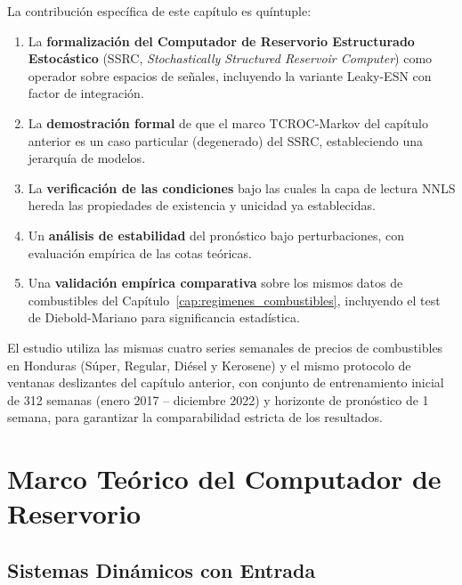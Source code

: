 La contribución específica de este capítulo es quíntuple:
\begin{enumerate}
    \item La \textbf{formalización del Computador de Reservorio
    Estructurado Estocástico} (SSRC, \textit{Stochastically
    Structured Reservoir Computer}) \cite{banegas2025} como operador
    sobre espacios de señales, incluyendo la variante Leaky-ESN con
    factor de integración.
    \item La \textbf{demostración formal} de que el marco
    TCROC-Markov del capítulo anterior es un caso particular
    (degenerado) del SSRC, estableciendo una jerarquía de modelos.
    \item La \textbf{verificación de las condiciones} bajo las cuales
    la capa de lectura NNLS hereda las propiedades de existencia y
    unicidad ya establecidas.
    \item Un \textbf{análisis de estabilidad} del pronóstico bajo
    perturbaciones, con evaluación empírica de las cotas teóricas.
    \item Una \textbf{validación empírica comparativa} sobre los
    mismos datos de combustibles del
    Capítulo~\ref{cap:regimenes_combustibles}, incluyendo el
    test de Diebold-Mariano para significancia estadística.
\end{enumerate}

El estudio utiliza las mismas cuatro series semanales de precios de
combustibles en Honduras (Súper, Regular, Diésel y Kerosene) y el
mismo protocolo de ventanas deslizantes del capítulo anterior, con
conjunto de entrenamiento inicial de 312 semanas (enero 2017 --
diciembre 2022) y horizonte de pronóstico de 1 semana, para garantizar
la comparabilidad estricta de los resultados.

\section{Marco Teórico del Computador de Reservorio}
\label{sec:ssrc_marco_teorico}

\subsection{Sistemas Dinámicos con Entrada}
\label{subsec:sistemas_dinamicos_entrada}

